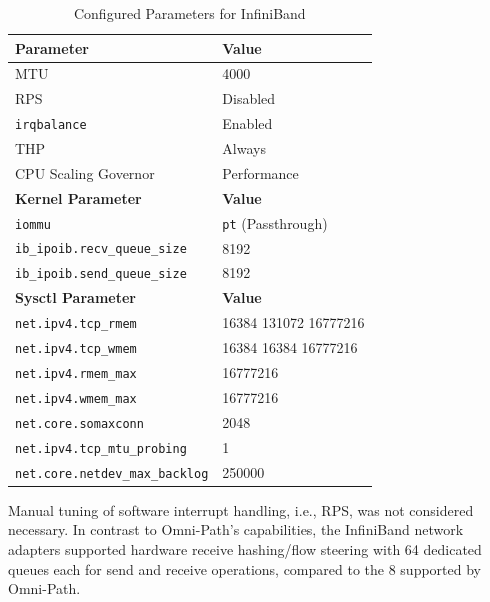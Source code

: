 \begin{table}[h]
\centering
\begin{tabular}{ll}
\hline
\textbf{Parameter}                      & \textbf{Value} \\
\hline
\ac{MTU}                                & 4000 \\
\ac{RPS}                                & Disabled \\
\texttt{irqbalance}                     & Enabled \\
\ac{THP}                                & Always \\
\ac{CPU} Scaling Governor               & Performance \\
\hline
\textbf{Kernel Parameter}               & \textbf{Value} \\
\hline
\texttt{iommu}                          & \texttt{pt} (Passthrough) \\
\texttt{ib\_ipoib.recv\_queue\_size}    & 8192 \\
\texttt{ib\_ipoib.send\_queue\_size}    & 8192 \\
\hline
\textbf{Sysctl Parameter}               & \textbf{Value} \\
\hline
\texttt{net.ipv4.tcp\_rmem}             & 16384 131072 16777216 \\
\texttt{net.ipv4.tcp\_wmem}             & 16384 16384 16777216 \\
\texttt{net.ipv4.rmem\_max}             & 16777216 \\
\texttt{net.ipv4.wmem\_max}             & 16777216 \\
\texttt{net.core.somaxconn}             & 2048 \\
\texttt{net.ipv4.tcp\_mtu\_probing}     & 1 \\
\texttt{net.core.netdev\_max\_backlog}  & 250000 \\


\hline
\end{tabular}
\caption{Configured Parameters for InfiniBand}
\label{tbl:infiniband-parameters}
\end{table}

Manual tuning of software interrupt handling, i.e., \ac{RPS}, was not considered necessary. In contrast to Omni-Path's capabilities, the InfiniBand network adapters supported hardware receive hashing/flow steering with 64 dedicated queues each for send and receive operations, compared to the 8 supported by Omni-Path.
